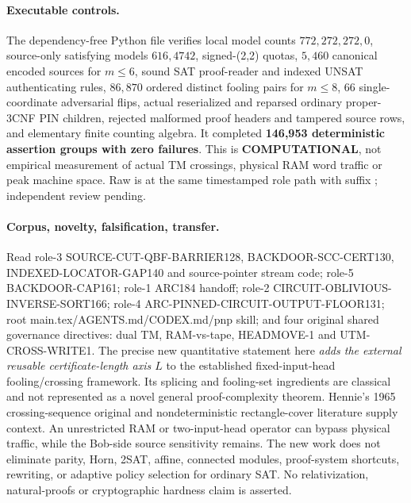 \documentclass[11pt]{article}
\begin{document}
\paragraph{Executable controls.}
The dependency-free Python file  verifies local model counts $772,272,272,0$, source-only satisfying models $616,4742$, signed-(2,2) quotas, $5,460$ canonical encoded sources for $m\le6$, sound SAT proof-reader and indexed UNSAT authenticating rules, $86,870$ ordered distinct fooling pairs for $m\le8$, $66$ single-coordinate adversarial flips, actual reserialized and reparsed ordinary proper-3CNF PIN children, rejected malformed proof headers and tampered source rows, and elementary finite counting algebra. It completed \textbf{146,953 deterministic assertion groups with zero failures}. This is \textbf{COMPUTATIONAL}, not empirical measurement of actual TM crossings, physical RAM word traffic or peak machine space. Raw is at the same timestamped role path with suffix ; independent review pending.

\paragraph{Corpus, novelty, falsification, transfer.}
Read role-3 SOURCE-CUT-QBF-BARRIER128, BACKDOOR-SCC-CERT130, INDEXED-LOCATOR-GAP140 and source-pointer stream code; role-5 BACKDOOR-CAP161; role-1 ARC184 handoff; role-2 CIRCUIT-OBLIVIOUS-INVERSE-SORT166; role-4 ARC-PINNED-CIRCUIT-OUTPUT-FLOOR131; root main.tex/AGENTS.md/CODEX.md/pnp skill; and four original shared governance directives: dual TM, RAM-vs-tape, HEADMOVE-1 and UTM-CROSS-WRITE1. The precise new quantitative statement here \emph{adds the external reusable certificate-length axis $L$} to the established fixed-input-head fooling/crossing framework. Its splicing and fooling-set ingredients are classical and not represented as a novel general proof-complexity theorem. Hennie's 1965 crossing-sequence original and nondeterministic rectangle-cover literature supply context. An unrestricted RAM or two-input-head operator can bypass physical traffic, while the Bob-side source sensitivity remains. The new work does not eliminate parity, Horn, 2SAT, affine, connected modules, proof-system shortcuts, rewriting, or adaptive policy selection for ordinary SAT. No relativization, natural-proofs or cryptographic hardness claim is asserted.
\end{document}
